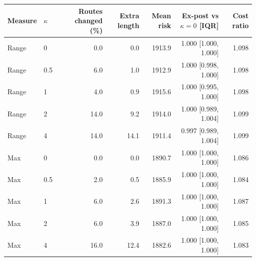 \begin{tabular}{llrrrrr}
\toprule
Measure & $\kappa$ & Routes changed (\%) & Extra length & Mean risk & Ex-post vs $\kappa{=}0$ [IQR] & Cost ratio \\
\midrule
Range & 0 & 0.0 & 0.0 & 1913.9 & 1.000 [1.000, 1.000] & 1.098 \\
Range & 0.5 & 6.0 & 1.0 & 1912.9 & 1.000 [0.998, 1.000] & 1.098 \\
Range & 1 & 4.0 & 0.9 & 1915.6 & 1.000 [0.995, 1.000] & 1.098 \\
Range & 2 & 14.0 & 9.2 & 1914.0 & 1.000 [0.989, 1.004] & 1.099 \\
Range & 4 & 14.0 & 14.1 & 1911.4 & 0.997 [0.989, 1.004] & 1.099 \\
Max & 0 & 0.0 & 0.0 & 1890.7 & 1.000 [1.000, 1.000] & 1.086 \\
Max & 0.5 & 2.0 & 0.5 & 1885.9 & 1.000 [1.000, 1.000] & 1.084 \\
Max & 1 & 6.0 & 2.6 & 1891.3 & 1.000 [1.000, 1.000] & 1.087 \\
Max & 2 & 6.0 & 3.9 & 1887.0 & 1.000 [1.000, 1.000] & 1.085 \\
Max & 4 & 16.0 & 12.4 & 1882.6 & 1.000 [1.000, 1.000] & 1.083 \\
\bottomrule
\end{tabular}
